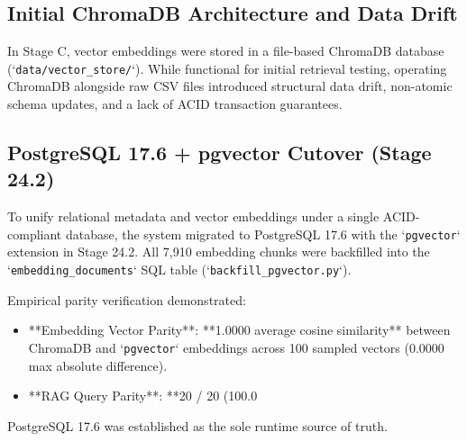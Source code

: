 \subsection{Initial ChromaDB Architecture and Data Drift}
In Stage C, vector embeddings were stored in a file-based ChromaDB database (`\texttt{data/vector_store/}`). While functional for initial retrieval testing, operating ChromaDB alongside raw CSV files introduced structural data drift, non-atomic schema updates, and a lack of ACID transaction guarantees.

\subsection{PostgreSQL 17.6 + pgvector Cutover (Stage 24.2)}
To unify relational metadata and vector embeddings under a single ACID-compliant database, the system migrated to PostgreSQL 17.6 with the `\texttt{pgvector}` extension in Stage 24.2. All 7,910 embedding chunks were backfilled into the `\texttt{embedding\_documents}` SQL table (`\texttt{backfill\_pgvector.py}`).

Empirical parity verification demonstrated:
\begin{itemize}
    \item **Embedding Vector Parity**: **1.0000 average cosine similarity** between ChromaDB and `\texttt{pgvector}` embeddings across 100 sampled vectors ($0.0000$ max absolute difference).
    \item **RAG Query Parity**: **20 / 20 (100.0%
\end{itemize}

PostgreSQL 17.6 was established as the sole runtime source of truth.

